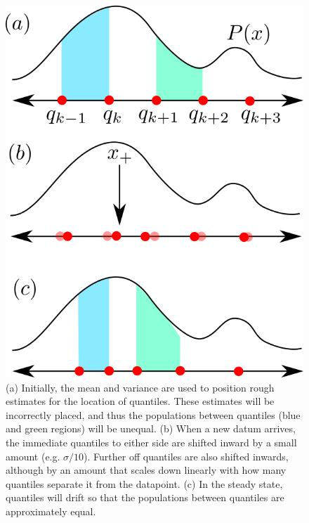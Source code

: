 \documentclass[conference]{IEEEtran}
\begin{document}
\begin{figure}[!t]
\centerline{\includegraphics[scale=1]{figs/distributions.png}}
\caption{(a) Initially, the mean and variance are used to position rough estimates for the location of quantiles. These estimates will be incorrectly placed, and thus the populations between quantiles (blue and green regions) will be unequal. (b) When a new datum arrives, the immediate quantiles to either side are shifted inward by a small amount (e.g. $\sigma / 10$). Further off quantiles are also shifted inwards, although by an amount that scales down linearly with how many quantiles separate it from the datapoint. (c) In the steady state, quantiles will drift so that the populations between quantiles are approximately equal.}
\label{distributions}
\end{figure}
\end{document}
